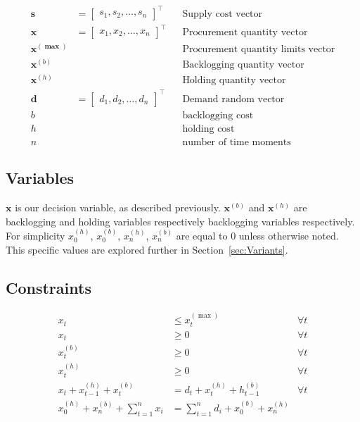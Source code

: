\begin{align*}
    \mathbf{s} &= \begin{bmatrix}
        s_1, s_2, \dotsc, s_n
    \end{bmatrix}^\intercal && \text{Supply cost vector} \\
    \mathbf{x} &= \begin{bmatrix}
        x_1, x_2, \dotsc, x_n
    \end{bmatrix}^\intercal && \text{Procurement quantity vector} \\
    \mathbf{x^{(\max)}}  & && \text{Procurement quantity limits vector} \\
    \mathbf{x}^{(b)}  & && \text{Backlogging quantity vector} \\
    \mathbf{x}^{(h)}  & && \text{Holding quantity vector} \\
    \mathbf{d} &= \begin{bmatrix}
        d_1, d_2, \dotsc, d_n
    \end{bmatrix}^\intercal && \text{Demand random vector} \\
    b & && \text{backlogging cost} \\
    h & && \text{holding cost} \\
    n & && \text{number of time moments}
\end{align*}


\subsection{Variables}
\label{sub:Variables}
$\mathbf{x}$ is our decision variable, as described previously. $\mathbf{x}^{(b)}$ and $\mathbf{x}^{(h)}$ are backlogging and holding variables respectively backlogging variables respectively. For simplicity
$x^{(h)}_0$, $x^{(b)}_0$,  $x^{(h)}_n$, $x^{(b)}_n$ are equal to $0$ unless otherwise noted. This specific values are explored further in Section~\ref{sec:Variants}.

\subsection{Constraints}
\label{sub:Constraints}
\begin{align*}
    x_t &\le x^{(\max)}_t & \forall t\\
    x_t &\ge 0 & \forall t\\
    x^{(b)}_t &\ge 0 & \forall t\\
    x^{(h)}_t &\ge 0 & \forall t\\
    x_t + x^{(h)}_{t - 1} + x^{(b)}_{t} &= d_t + x^{(h)}_t + h^{(b)}_{t - 1} & \forall t \\
    x^{(h)}_0 + x^{(b)}_n + \sum_{t=1}^n{x_i} &= \sum_{t=1}^n{d_i} + x^{(b)}_0 + x^{(h)}_n &\\
\end{align*}

